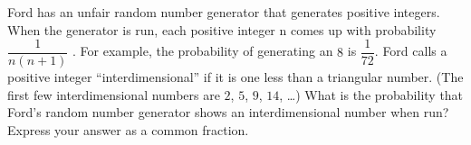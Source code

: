 Ford has an unfair random number generator that generates positive integers. When the generator is run, each positive integer n comes up with probability $\dfrac{1}{n(n +1)}$ . For example, the probability of generating an $8$ is $\dfrac{1}{72}$. Ford calls a positive integer ``interdimensional'' if it is one less than a triangular number. (The first few interdimensional numbers are $2$, $5$, $9$, $14$, \ldots{}) What is the probability that Ford's random number generator shows an interdimensional number when run? Express your answer as a common fraction.
